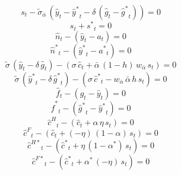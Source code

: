 \begin{dmath}
{{s}}_{t}-{{\tilde\sigma_{\bar{\alpha}}}}\, \left({{\hat y}}_{t}-{{\hat y^*}}_{t}-{{\delta}}\, \left({{\hat g}}_{t}-{{\hat g^*}}_{t}\right)\right)=0
\end{dmath}
\begin{dmath}
{{s}}_{t}+{{s^*}}_{t}=0
\end{dmath}
\begin{dmath}
{{\hat n}}_{t}-\left({{\hat y}}_{t}-{{a}}_{t}\right)=0
\end{dmath}
\begin{dmath}
{{\hat n^*}}_{t}-\left({{\hat y^*}}_{t}-{{a^*}}_{t}\right)=0
\end{dmath}
\begin{dmath}
{{\tilde{\sigma}}}\, \left({{\hat y}}_{t}-{{\delta}}\, {{\hat g}}_{t}\right)-\left({{\sigma}}\, {{\hat c}}_{t}+{{\bar{\alpha}}}\, \left(1-{{h}}\right)\, {{w_{\bar{\alpha}}}}\, {{s}}_{t}\right)=0
\end{dmath}
\begin{dmath}
{{\tilde{\sigma}}}\, \left({{\hat y^*}}_{t}-{{\delta}}\, {{\hat g^*}}_{t}\right)-\left({{\sigma}}\, {{\hat c^*}}_{t}-{{w_{\bar{\alpha}}}}\, {{\bar{\alpha}}}\, {{h}}\, {{s}}_{t}\right)=0
\end{dmath}
\begin{dmath}
{{\hat f}}_{t}-\left({{\hat g}}_{t}-{{\hat y}}_{t}\right)=0
\end{dmath}
\begin{dmath}
{{\hat f^*}}_{t}-\left({{\hat g^*}}_{t}-{{\hat y^*}}_{t}\right)=0
\end{dmath}
\begin{dmath}
{{\hat c^H}}_{t}-\left({{\hat c}}_{t}+{{\alpha}}\, {{\eta}}\, {{s}}_{t}\right)=0
\end{dmath}
\begin{dmath}
{{\hat c^F}}_{t}-\left({{\hat c}}_{t}+\left(-{{\eta}}\right)\, \left(1-{{\alpha}}\right)\, {{s}}_{t}\right)=0
\end{dmath}
\begin{dmath}
{{\hat c^{H*}}}_{t}-\left({{\hat c^*}}_{t}+{{\eta}}\, \left(1-{{\alpha^*}}\right)\, {{s}}_{t}\right)=0
\end{dmath}
\begin{dmath}
{{\hat c^{F*}}}_{t}-\left({{\hat c^*}}_{t}+{{\alpha^*}}\, \left(-{{\eta}}\right)\, {{s}}_{t}\right)=0
\end{dmath}
